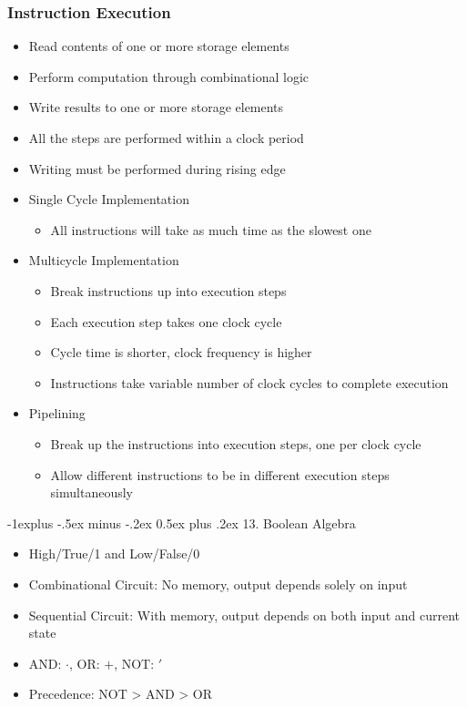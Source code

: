 \documentclass[10pt, portrait]{article}
\makeatletter
\renewcommand{\section}{\@startsection{section}{1}{0mm}%
                                {-1ex plus -.5ex minus -.2ex}%
                                {0.5ex plus .2ex}%
                                {\normalfont\large\bfseries}}
\renewcommand{\section}{\@startsection{section}{2}{0mm}%
                                {-1explus -.5ex minus -.2ex}%
                                {0.5ex plus .2ex}%
                                {\normalfont\normalsize\bfseries}}
\makeatother
\begin{document}
\begin{multicols*}{2}
\subsubsection{Instruction Execution}
\begin{itemize}
    \item Read contents of one or more storage elements
    \item Perform computation through combinational logic
    \item Write results to one or more storage elements
    \item All the steps are performed within a clock period
    \item Writing must be performed during rising edge
    \item Single Cycle Implementation
    \begin{itemize}
        \item All instructions will take as much time as the slowest one
    \end{itemize}
    \item Multicycle Implementation
    \begin{itemize}
        \item Break instructions up into execution steps
        \item Each execution step takes one clock cycle
        \item Cycle time is shorter, clock frequency is higher
        \item Instructions take variable number of clock cycles to complete execution
    \end{itemize}
    \item Pipelining
    \begin{itemize}
        \item Break up the instructions into execution steps, one per clock cycle
        \item Allow different instructions to be in different execution steps simultaneously
    \end{itemize}
\end{itemize}

\section{13. Boolean Algebra}
\begin{itemize}
    \item High/True/1 and Low/False/0
    \item Combinational Circuit: No memory, output depends solely on input
    \item Sequential Circuit: With memory, output depends on both input and current state
    \item AND: $\cdot$, OR: $+$, NOT: $'$
    \item Precedence: NOT > AND > OR
\end{itemize}


\end{multicols*}
\end{document}
